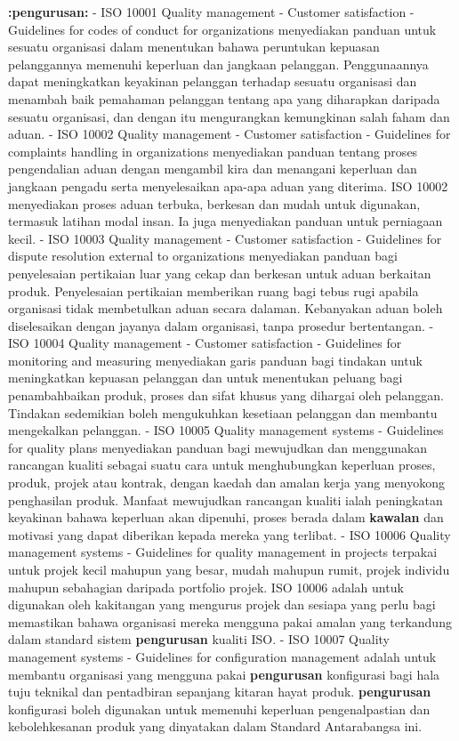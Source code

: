 \documentclass{article}
\begin{document}
\textbf{:pengurusan:} - ISO 10001 Quality management - Customer satisfaction - Guidelines for codes of
 conduct for organizations menyediakan panduan untuk sesuatu organisasi dalam
 menentukan bahawa peruntukan kepuasan pelanggannya memenuhi keperluan dan
 jangkaan pelanggan. Penggunaannya dapat meningkatkan keyakinan pelanggan
 terhadap sesuatu organisasi dan menambah baik pemahaman pelanggan tentang apa
 yang diharapkan daripada sesuatu organisasi, dan dengan itu mengurangkan
 kemungkinan salah faham dan aduan.
- ISO 10002 Quality management - Customer satisfaction - Guidelines for complaints
 handling in organizations menyediakan panduan tentang proses pengendalian aduan
 dengan mengambil kira dan menangani keperluan dan jangkaan pengadu serta
 menyelesaikan apa-apa aduan yang diterima. ISO 10002 menyediakan proses aduan
 terbuka, berkesan dan mudah untuk digunakan, termasuk latihan modal insan. Ia juga
 menyediakan panduan untuk perniagaan kecil.
- ISO 10003 Quality management - Customer satisfaction - Guidelines for dispute
 resolution external to organizations menyediakan panduan bagi penyelesaian pertikaian
 luar yang cekap dan berkesan untuk aduan berkaitan produk. Penyelesaian pertikaian
 memberikan ruang bagi tebus rugi apabila organisasi tidak membetulkan aduan secara
 dalaman. Kebanyakan aduan boleh diselesaikan dengan jayanya dalam organisasi,
 tanpa prosedur bertentangan.
- ISO 10004 Quality management - Customer satisfaction - Guidelines for monitoring and
 measuring menyediakan garis panduan bagi tindakan untuk meningkatkan kepuasan
 pelanggan dan untuk menentukan peluang bagi penambahbaikan produk, proses dan
 sifat khusus yang dihargai oleh pelanggan. Tindakan sedemikian boleh mengukuhkan
 kesetiaan pelanggan dan membantu mengekalkan pelanggan.
- ISO 10005 Quality management systems - Guidelines for quality plans menyediakan
 panduan bagi mewujudkan dan menggunakan rancangan kualiti sebagai suatu cara
 untuk menghubungkan keperluan proses, produk, projek atau kontrak, dengan kaedah
 dan amalan kerja yang menyokong penghasilan produk. Manfaat mewujudkan rancangan
 kualiti ialah peningkatan keyakinan bahawa keperluan akan dipenuhi, proses berada
 dalam \textbf{kawalan} dan motivasi yang dapat diberikan kepada mereka yang terlibat.
- ISO 10006 Quality management systems - Guidelines for quality management in projects
 terpakai untuk projek kecil mahupun yang besar, mudah mahupun rumit, projek individu
 mahupun sebahagian daripada portfolio projek. ISO 10006 adalah untuk digunakan oleh
 kakitangan yang mengurus projek dan sesiapa yang perlu bagi memastikan bahawa
 organisasi mereka mengguna pakai amalan yang terkandung dalam standard sistem
 \textbf{pengurusan} kualiti ISO.
- ISO 10007 Quality management systems - Guidelines for configuration management
 adalah untuk membantu organisasi yang mengguna pakai \textbf{pengurusan} konfigurasi bagi
 hala tuju teknikal dan pentadbiran sepanjang kitaran hayat produk. \textbf{pengurusan}
 konfigurasi boleh digunakan untuk memenuhi keperluan pengenalpastian dan
 kebolehkesanan produk yang dinyatakan dalam Standard Antarabangsa ini.
\end{document}
